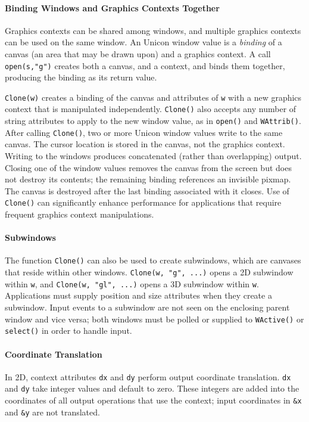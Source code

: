 \paragraph{Binding Windows and Graphics Contexts Together}
Graphics contexts can be shared among windows, and multiple graphics
contexts can be used on the same window. An Unicon window value is a
\textit{binding} of a canvas (an area that may be drawn upon) and a
graphics context. A call \texttt{open(s,"g")} creates both a canvas,
and a context, and binds them together, producing the binding as its
return value.

\texttt{Clone(w)} creates a binding of the canvas and attributes of
\texttt{w} with a new graphics context that is manipulated
independently. \texttt{Clone()} also accepts any number of string
attributes to apply to the new window value, as in \texttt{open()} and
\texttt{WAttrib()}.  After calling \texttt{Clone()}, two or more
Unicon window values write to the same canvas. The cursor location is
stored in the canvas, not the graphics context. Writing to the windows
produces concatenated (rather than overlapping) output. Closing one of
the window values removes the canvas from the screen but does not
destroy its contents; the remaining binding references an invisible
pixmap.  The canvas is destroyed after the last binding associated
with it closes. Use of \texttt{Clone()} can significantly enhance
performance for applications that require frequent graphics context
manipulations.

\paragraph{Subwindows}
The function \texttt{Clone()} can also be used to create subwindows,
which are canvases that reside within other windows.
\texttt{Clone(w, "g", ...)}  opens a 2D subwindow within \texttt{w}, and
\texttt{Clone(w, "gl", ...)} opens a 3D subwindow within
\texttt{w}. Applications must supply position and size attributes when
they create a subwindow. Input events to a subwindow are not seen on
the enclosing parent window and vice versa; both windows must be
polled or supplied to \texttt{WActive()} or \texttt{select()} in order
to handle input.

\paragraph{Coordinate Translation}
In 2D, context attributes \texttt{dx} and \texttt{dy} perform output
coordinate translation. \texttt{dx} and \texttt{dy} take integer
values and default to zero. These integers are added into the
coordinates of all output operations that use the context; input
coordinates in \texttt{\&x} and \texttt{\&y} are not translated.

